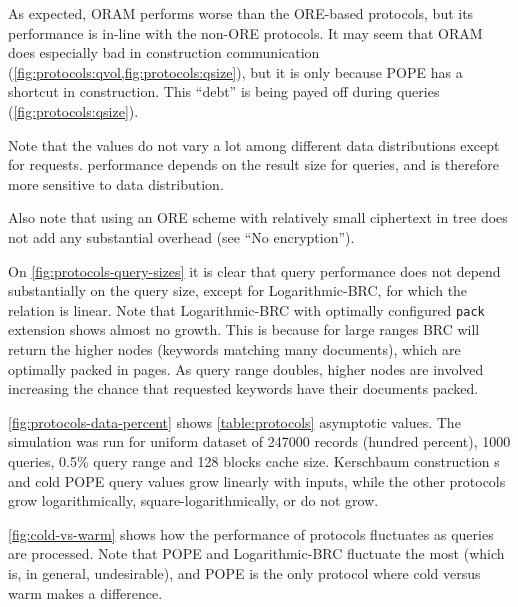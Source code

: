 			As expected, ORAM performs worse than the ORE-based protocols, but its performance is in-line with the non-ORE protocols.
			It may seem that ORAM does especially bad in construction communication (\cref{fig:protocols:qvol,fig:protocols:qsize}), but it is only because POPE has a shortcut in construction.
			This ``debt'' is being payed off during queries (\cref{fig:protocols:qsize}).

			Note that the values do not vary a lot among different data distributions except for {\IO} requests.
			{\IO} performance depends on the result size for queries, and is therefore more sensitive to data distribution.

			Also note that using an ORE scheme with relatively small ciphertext in {\BPlus} tree does not add any substantial {\IO} overhead (see ``No encryption'').

			On \cref{fig:protocols-query-sizes} it is clear that query performance does not depend substantially on the query size, except for Logarithmic\hyp{}BRC, for which the relation is linear.
			Note that Logarithmic\hyp{}BRC with optimally configured \texttt{pack} extension shows almost no growth.
			This is because for large ranges BRC will return the higher nodes (keywords matching many documents), which are optimally packed in {\IO} pages.
			As query range doubles, higher nodes are involved increasing the chance that requested keywords have their documents packed.

			

			\cref{fig:protocols-data-percent} shows \cref{table:protocols} asymptotic values.
			The simulation was run for uniform dataset of 247000 records (hundred percent), 1000 queries, 0.5\% query range and 128 blocks cache size.
			Kerschbaum construction {\IO}s and cold POPE query values grow linearly with inputs, while the other protocols grow logarithmically, square-logarithmically, or do not grow.

			\cref{fig:cold-vs-warm} shows how the performance of protocols fluctuates as queries are processed.
			Note that POPE and Logarithmic\hyp{}BRC fluctuate the most (which is, in general, undesirable), and POPE is the only protocol where cold versus warm makes a difference.
